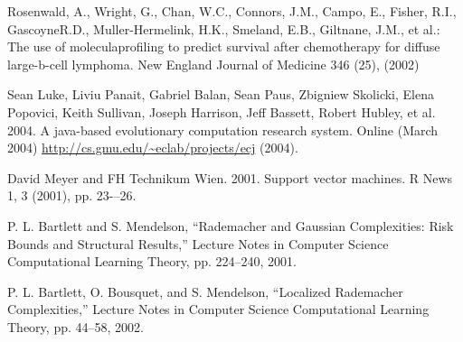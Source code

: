 \documentclass[conference]{IEEEtran}
\begin{document}
\begin{thebibliography}{00}
 Rosenwald, A., Wright, G., Chan, W.C., Connors, J.M., Campo, E., Fisher, R.I., GascoyneR.D., Muller-Hermelink, H.K., Smeland, E.B., Giltnane, J.M., et al.: The use of moleculaprofiling to predict survival after chemotherapy for diffuse large-b-cell lymphoma. New England Journal of Medicine 346 (25), (2002)

 Sean Luke, Liviu Panait, Gabriel Balan, Sean Paus, Zbigniew Skolicki, Elena
Popovici, Keith Sullivan, Joseph Harrison, Jeff Bassett, Robert Hubley, et al. 2004.
A java-based evolutionary computation research system. Online (March 2004)
\url{http://cs.gmu.edu/~eclab/projects/ecj} (2004).

 David Meyer and FH Technikum Wien. 2001. Support vector machines. R News
1, 3 (2001), pp. 23-–26.

 P. L. Bartlett and S. Mendelson, “Rademacher and Gaussian Complexities: Risk Bounds and Structural Results,” Lecture Notes in Computer Science Computational Learning Theory, pp. 224–240, 2001.

 P. L. Bartlett, O. Bousquet, and S. Mendelson, “Localized Rademacher Complexities,” Lecture Notes in Computer Science Computational Learning Theory, pp. 44–58, 2002.

\end{thebibliography}
\end{document}
